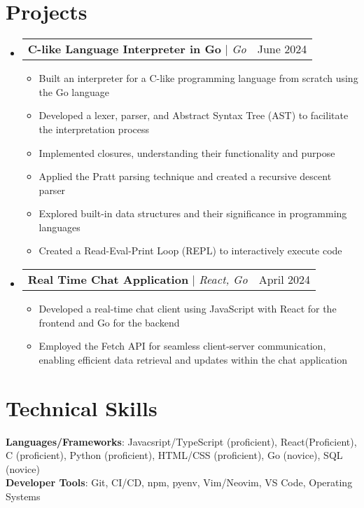 \documentclass[letterpaper,11pt]{article}
\makeatletter
\newcommand{\resumeItem}[1]{
  \item\small{
    {#1 \vspace{-2pt}}
  }
}
\newcommand{\resumeProjectHeading}[2]{
    \item
    \begin{tabular*}{0.97\textwidth}{l@{\extracolsep{\fill}}r}
      \small#1 & #2 \\
    \end{tabular*}\vspace{-7pt}
}
\newcommand{\resumeSubHeadingListStart}{\begin{itemize}[leftmargin=0.15in, label={}]}
\newcommand{\resumeSubHeadingListEnd}{\end{itemize}}
\newcommand{\resumeItemListStart}{\begin{itemize}}
\newcommand{\resumeItemListEnd}{\end{itemize}\vspace{-5pt}}
\makeatother
\begin{document}
\section{Projects}
    \resumeSubHeadingListStart
      \resumeProjectHeading
          {\textbf{C-like Language Interpreter in Go} $|$ \emph{Go}}{June 2024}
          \resumeItemListStart
            \resumeItem{Built an interpreter for a C-like programming language from scratch using the Go language}
            \resumeItem{Developed a lexer, parser, and Abstract Syntax Tree (AST) to facilitate the interpretation process}
            \resumeItem{Implemented closures, understanding their functionality and purpose}
            \resumeItem{Applied the Pratt parsing technique and created a recursive descent parser}
            \resumeItem{Explored built-in data structures and their significance in programming languages}
            \resumeItem{Created a Read-Eval-Print Loop (REPL) to interactively execute code}
          \resumeItemListEnd
      \resumeProjectHeading
          {\textbf{Real Time Chat Application} $|$ \emph{React, Go}}{April 2024}
          \resumeItemListStart
            \resumeItem{Developed a real-time chat client using JavaScript with React for the frontend and Go for the backend}
            \resumeItem{Employed the Fetch API for seamless client-server communication, enabling efficient data retrieval and updates within the chat application}
          \resumeItemListEnd
    \resumeSubHeadingListEnd

\section{Technical Skills}
 \begin{itemize}[leftmargin=0.15in, label={}]
    \small{\item{
     \textbf{Languages/Frameworks}{: Javacsript/TypeScript (proficient), React(Proficient), C (proficient), Python (proficient), HTML/CSS (proficient), Go (novice), SQL (novice) } \\
     \textbf{Developer Tools}{: Git, CI/CD, npm, pyenv, Vim/Neovim, VS Code, Operating Systems} \\
    }}
 \end{itemize}


\end{document}
